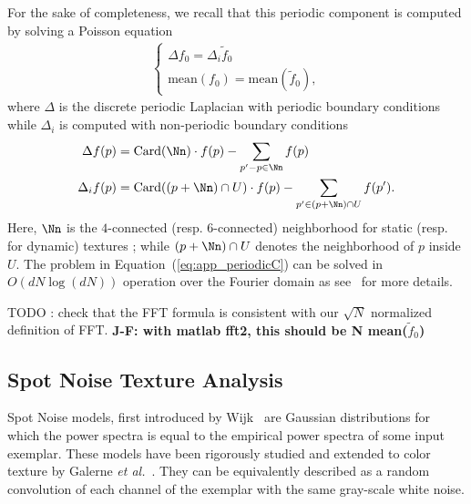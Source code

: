 For the sake of completeness, we recall that this periodic component is computed by solving a Poisson equation
\begin{align}
\left\{
\begin{array}{ll}
 \Delta f_0 = \Delta_i \tilde f_0 \\
 \textrm{mean}(f_0) = \textrm{mean}(\tilde f_0),
\end{array}
\right.
\label{eq:app_periodicC}
\end{align}
where $\Delta$ is the discrete periodic Laplacian with periodic boundary conditions while 
$\Delta_i$ is computed with non-periodic boundary conditions
\begin{align*}
	\Delta f(p) & = \textrm{Card}(\Nn) \cdot f(p) - \sum_{p'-p \in \Nn} f(p) \\
	\Delta_i f(p) & = \textrm{Card}((p+\Nn) \cap U) \cdot f(p) - \sum_{p' \in (p+\Nn) \cap U} f(p').
\end{align*}
Here, $\Nn$ is the $4$-connected (resp. $6$-connected) neighborhood for static (resp. for dynamic) textures ; while $(p+\Nn) \cap U$ denotes the neighborhood of $p$ inside $U$. The problem in Equation~(\ref{eq:app_periodicC}) can be solved in $O(dN\log(dN))$ operation over the Fourier domain as
see~\cite{Moisan11} for more details.

TODO : check that the FFT formula is consistent with our $\sqrt{N}$ normalized definition of FFT.
\textbf{J-F: with matlab fft2, this should be N mean($\tilde{f}_0$)}



\subsection{Spot Noise Texture Analysis}

Spot Noise models, first introduced by Wijk~\cite{Wijk1991} are Gaussian distributions for which the power spectra is equal to the empirical power spectra of some input exemplar. These models have been rigorously studied and extended to color texture by Galerne \emph{et al.}~\cite{Galerne2011}. They can be equivalently described as a random convolution of each channel of the exemplar with the same gray-scale white noise. 

